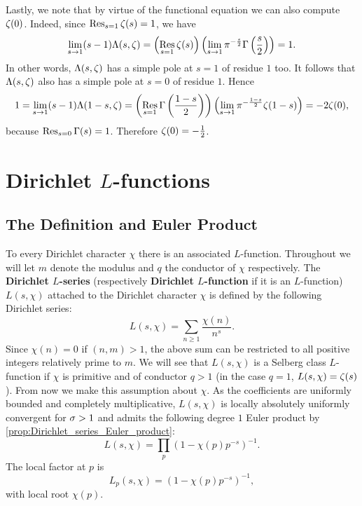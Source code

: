       Lastly, we note that by virtue of the functional equation we can also compute $\zeta(0)$. Indeed, since $\operatorname*{\mathrm{Res}}_{s = 1}\zeta(s) = 1$, we have
      \[
        \lim_{s \to 1}(s-1)\Lambda(s,\zeta) = \left(\operatorname*{\mathrm{Res}}_{s = 1}\zeta(s)\right)\left(\lim_{s \to 1}\pi^{-\frac{s}{2}}\Gamma\left(\frac{s}{2}\right)\right) = 1.
      \]
      In other words, $\Lambda(s,\zeta)$ has a simple pole at $s = 1$ of residue $1$ too. It follows that $\Lambda(s,\zeta)$ also has a simple pole at $s = 0$ of residue $1$. Hence
      \[
        1 = \lim_{s \to 1}(s-1)\Lambda(1-s,\zeta) = \left(\operatorname*{\mathrm{Res}}_{s = 1}\Gamma\left(\frac{1-s}{2}\right)\right)\left(\lim_{s \to 1}\pi^{-\frac{1-s}{2}}\zeta(1-s)\right) = -2\zeta(0),
      \]
      because $\operatorname*{\mathrm{Res}}_{s = 0}\Gamma(s) = 1$. Therefore $\zeta(0) = -\frac{1}{2}$.
  \section{Dirichlet \texorpdfstring{$L$}{L}-functions}
    \subsection*{The Definition and Euler Product}
      To every Dirichlet character $\chi$ there is an associated $L$-function. Throughout we will let $m$ denote the modulus and $q$ the conductor of $\chi$ respectively. The \textbf{Dirichlet $L$-series} (respectively \textbf{Dirichlet $L$-function} if it is an $L$-function) $L(s,\chi)$ attached to the Dirichlet character $\chi$ is defined by the following Dirichlet series:
      \[
        L(s,\chi) = \sum_{n \ge 1}\frac{\chi(n)}{n^{s}}.
      \]
      Since $\chi(n) = 0$ if $(n,m) > 1$, the above sum can be restricted to all positive integers relatively prime to $m$. We will see that $L(s,\chi)$ is a Selberg class $L$-function if $\chi$ is primitive and of conductor $q > 1$ (in the case $q = 1$, $L(s,\chi) = \zeta(s)$). From now we make this assumption about $\chi$. As the coefficients are uniformly bounded and completely multiplicative, $L(s,\chi)$ is locally absolutely uniformly convergent for $\sigma > 1$ and admits the following degree $1$ Euler product by \cref{prop:Dirichlet_series_Euler_product}:
      \[
        L(s,\chi) = \prod_{p}(1-\chi(p)p^{-s})^{-1}.
      \]
      The local factor at $p$ is
      \[
        L_{p}(s,\chi) = (1-\chi(p)p^{-s})^{-1},
      \]
      with local root $\chi(p)$.
